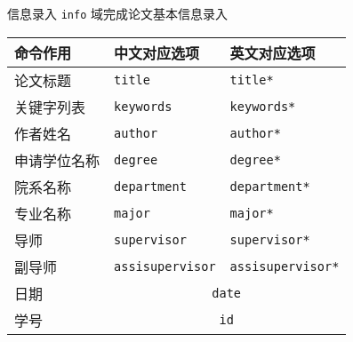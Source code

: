 \begin{frame}[fragile]{信息录入}
  \verb|info| 域完成论文基本信息录入
  \begin{table}[h]
    \centering
    \footnotesize
    \begin{tabular}{lll} \toprule
      命令作用     & 中文对应选项                      & 英文对应选项      \\ \midrule
      论文标题     & \verb|title|                           & \verb|title*|          \\
      关键字列表   & \verb|keywords|                        & \verb|keywords*|       \\
      作者姓名     & \verb|author|                          & \verb|author*|         \\
      申请学位名称 & \verb|degree|                          & \verb|degree*|         \\
      院系名称     & \verb|department|                      & \verb|department*|     \\
      专业名称     & \verb|major|                           & \verb|major*|          \\
      导师         & \verb|supervisor|                      & \verb|supervisor*|     \\
      副导师       & \verb|assisupervisor|                  & \verb|assisupervisor*| \\
      日期         & \multicolumn{2}{c}{\texttt{date}}                     \\
      学号         & \multicolumn{2}{c}{\texttt{id}}                       \\ \bottomrule
    \end{tabular}
  \end{table}
\end{frame}

